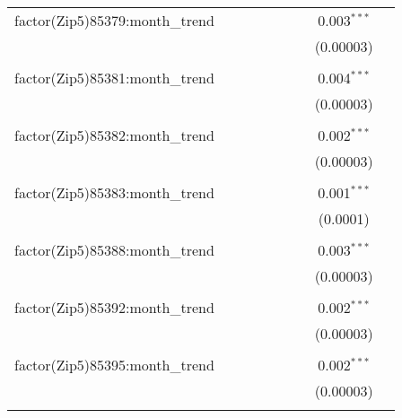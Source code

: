 \begin{table}[H]
{\begin{tabular}{@{\extracolsep{5pt}}lcccccccc}
  factor(Zip5)85379:month\_trend &  &  &  &  &  &  & 0.003$^{***}$ &  \\  

   &  &  &  &  &  &  & (0.00003) &  \\  

   & & & & & & & & \\  

  factor(Zip5)85381:month\_trend &  &  &  &  &  &  & 0.004$^{***}$ &  \\  

   &  &  &  &  &  &  & (0.00003) &  \\  

   & & & & & & & & \\  

  factor(Zip5)85382:month\_trend &  &  &  &  &  &  & 0.002$^{***}$ &  \\  

   &  &  &  &  &  &  & (0.00003) &  \\  

   & & & & & & & & \\  

  factor(Zip5)85383:month\_trend &  &  &  &  &  &  & 0.001$^{***}$ &  \\  

   &  &  &  &  &  &  & (0.0001) &  \\  

   & & & & & & & & \\  

  factor(Zip5)85388:month\_trend &  &  &  &  &  &  & 0.003$^{***}$ &  \\  

   &  &  &  &  &  &  & (0.00003) &  \\  

   & & & & & & & & \\  

  factor(Zip5)85392:month\_trend &  &  &  &  &  &  & 0.002$^{***}$ &  \\  

   &  &  &  &  &  &  & (0.00003) &  \\  

   & & & & & & & & \\  

  factor(Zip5)85395:month\_trend &  &  &  &  &  &  & 0.002$^{***}$ &  \\  

   &  &  &  &  &  &  & (0.00003) &  \\  

   & & & & & & & & \\  


\end{tabular}}
\end{table}
